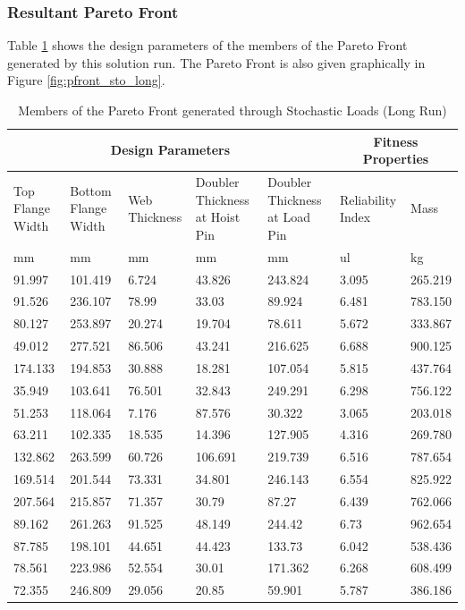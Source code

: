 \subsubsection{Resultant Pareto Front}
Table \ref{tab:pfront_sto_long} shows the design parameters of the members of the Pareto Front generated by this solution run. The Pareto Front is also given graphically in Figure \ref{fig:pfront_sto_long}. 
\begin{table}[!htbp]
\centering
\small
\begin{tabular}{|p{1.5cm}p{1.5cm}p{1.4cm}p{2cm}p{2cm}||p{1.5cm}p{1.5cm}|}
\hline
\multicolumn{5}{|c||}{Design Parameters}&\multicolumn{2}{|c|}{Fitness Properties}\\
\hline
Top Flange Width&Bottom Flange Width&Web Thickness&Doubler Thickness at Hoist Pin&Doubler Thickness at Load Pin&Reliability Index& Mass\\
\hline
mm&mm&mm&mm&mm&ul&kg\\
\hline
91.997&101.419&6.724&43.826&243.824&3.095&265.219\\
91.526&236.107&78.99&33.03&89.924&6.481&783.150\\
80.127&253.897&20.274&19.704&78.611&5.672&333.867\\
49.012&277.521&86.506&43.241&216.625&6.688&900.125\\
174.133&194.853&30.888&18.281&107.054&5.815&437.764\\
35.949&103.641&76.501&32.843&249.291&6.298&756.122\\
51.253&118.064&7.176&87.576&30.322&3.065&203.018\\
63.211&102.335&18.535&14.396&127.905&4.316&269.780\\
132.862&263.599&60.726&106.691&219.739&6.516&787.654\\
169.514&201.544&73.331&34.801&246.143&6.554&825.922\\
207.564&215.857&71.357&30.79&87.27&6.439&762.066\\
89.162&261.263&91.525&48.149&244.42&6.73&962.654\\
87.785&198.101&44.651&44.423&133.73&6.042&538.436\\
78.561&223.986&52.554&30.01&171.362&6.268&608.499\\
72.355&246.809&29.056&20.85&59.901&5.787&386.186\\
\hline
\end{tabular}
	\caption{Members of the Pareto Front generated through Stochastic Loads (Long Run)}
\label{tab:pfront_sto_long}
\end{table}

